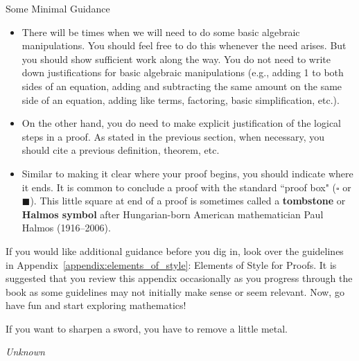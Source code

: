 \begin{section}{Some Minimal Guidance}
\begin{itemize}
\item There will be times when we will need to do some basic algebraic manipulations.  You should feel free to do this whenever the need arises.  But you should show sufficient work along the way.  You do not need to write down justifications for basic algebraic manipulations (e.g., adding 1 to both sides of an equation, adding and subtracting the same amount on the same side of an equation, adding like terms, factoring, basic simplification, etc.).  
\item On the other hand, you do need to make explicit justification of the logical steps in a proof.  As stated in the previous section, when necessary, you should cite a previous definition, theorem, etc.
\item Similar to making it clear where your proof begins, you should indicate where it ends.  It is common to conclude a proof with the standard ``proof box" ($\square$ or $\blacksquare$).  This little square at end of a proof is sometimes called a \textbf{tombstone} or \textbf{Halmos symbol} after Hungarian-born American mathematician Paul Halmos (1916--2006).
\end{itemize}

If you would like additional guidance before you dig in, look over the guidelines in Appendix~\ref{appendix:elements_of_style}: Elements of Style for Proofs. It is suggested that you review this appendix occasionally as you progress through the book as some guidelines may not initially make sense or seem relevant. Now, go have fun and start exploring mathematics!

\epigraph{If you want to sharpen a sword, you have to remove a little metal.}{\emph{Unknown}}

\end{section}
